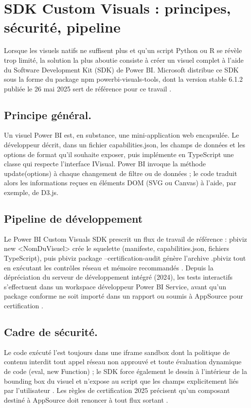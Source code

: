 \section{SDK Custom Visuals : principes, sécurité, pipeline}
\label{sec:sdk}

Lorsque les visuels natifs ne suffisent plus et qu’un script Python ou R se révèle trop limité, la solution la plus aboutie consiste à créer un visuel complet à l’aide du Software Development Kit (SDK) de Power BI. Microsoft distribue ce SDK sous la forme du package npm powerbi-visuals-tools, dont la version stable 6.1.2 publiée le 26 mai 2025 sert de référence pour ce travail \parencite{MicrosoftSDKNpm2025}.  

\subsection{Principe général.} Un visuel Power BI est, en substance, une mini-application web encapsulée. Le développeur décrit, dans un fichier capabilities.json, les champs de données et les options de format qu’il souhaite exposer, puis implémente en TypeScript une classe qui respecte l’interface IVisual. Power BI invoque la méthode update(options) à chaque changement de filtre ou de données ; le code traduit alors les informations reçues en éléments DOM (SVG ou Canvas) à l’aide, par exemple, de D3.js.  

\subsection{Pipeline de développement}\label{sec:pipeline-ref}

Le Power BI Custom Visuals SDK prescrit un flux de travail de référence :  
pbiviz new <NomDuVisuel> crée le squelette (manifeste, capabilities.json, fichiers TypeScript),  
puis pbiviz package --certification-audit génère l’archive .pbiviz tout en exécutant les contrôles réseau et mémoire recommandés \parencite{MicrosoftAuditCLI2025}.  
Depuis la dépréciation du serveur de développement intégré (2024), les tests interactifs s’effectuent dans un workspace développeur Power BI Service, avant qu’un package conforme ne soit importé dans un rapport ou soumis à AppSource pour certification \parencite{MicrosoftCertificationGuide2025}.

\subsection{Cadre de sécurité.} Le code exécuté l’est toujours dans une iframe sandbox dont la politique de contenu interdit tout appel réseau non approuvé et toute évaluation dynamique de code (eval, new Function) ; le SDK force également le dessin à l’intérieur de la bounding box du visuel et n’expose au script que les champs explicitement liés par l’utilisateur \parencite{OkVizSandbox2022}. Les règles de certification 2025 précisent qu’un composant destiné à AppSource doit renoncer à tout flux sortant \parencite{MicrosoftAPIv6CSP2025}.  

